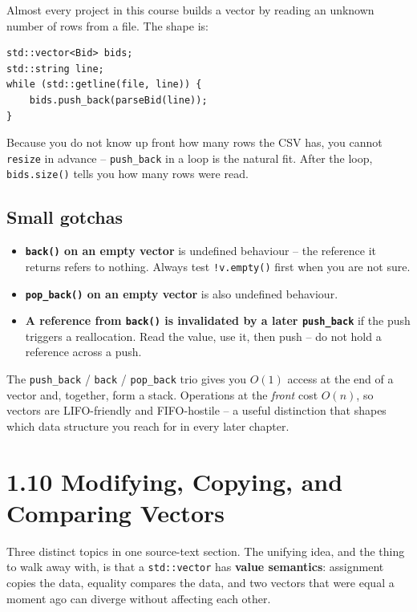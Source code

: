 \documentclass[11pt]{article}
\begin{document}
\begin{examplebox}
Almost every project in this course builds a vector by reading an
unknown number of rows from a file. The shape is:
\begin{lstlisting}
std::vector<Bid> bids;
std::string line;
while (std::getline(file, line)) {
    bids.push_back(parseBid(line));
}
\end{lstlisting}
Because you do not know up front how many rows the CSV has, you
cannot \texttt{resize} in advance -- \texttt{push\_back} in a loop
is the natural fit. After the loop, \texttt{bids.size()} tells you
how many rows were read.
\end{examplebox}

\subsection{Small gotchas}

\begin{itemize}
    \item \textbf{\texttt{back()} on an empty vector} is undefined
          behaviour -- the reference it returns refers to nothing.
          Always test \texttt{!v.empty()} first when you are not
          sure.
    \item \textbf{\texttt{pop\_back()} on an empty vector} is also
          undefined behaviour.
    \item \textbf{A reference from \texttt{back()} is invalidated by
          a later \texttt{push\_back}} if the push triggers a
          reallocation. Read the value, use it, then push -- do not
          hold a reference across a push.
\end{itemize}

\begin{ideabox}
The \texttt{push\_back} / \texttt{back} / \texttt{pop\_back} trio
gives you $O(1)$ access at the end of a vector and, together, form a
stack. Operations at the \emph{front} cost $O(n)$, so vectors are
LIFO-friendly and FIFO-hostile -- a useful distinction that shapes
which data structure you reach for in every later chapter.
\end{ideabox}

\section{1.10 Modifying, Copying, and Comparing Vectors}

Three distinct topics in one source-text section. The unifying idea,
and the thing to walk away with, is that a \texttt{std::vector} has
\textbf{value semantics}: assignment copies the data, equality compares
the data, and two vectors that were equal a moment ago can diverge
without affecting each other.
\end{document}
